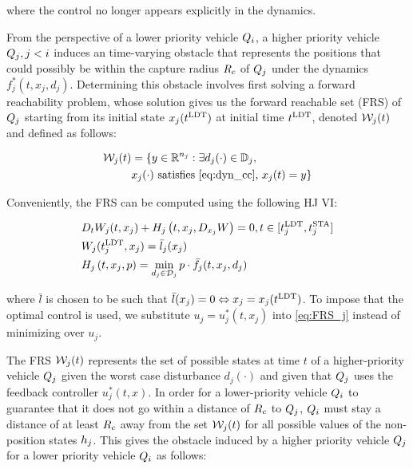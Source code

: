 \noindent where the control no longer appears explicitly in the dynamics.

From the perspective of a lower priority vehicle $Q_i$, a higher priority vehicle $Q_j, j < i$ induces an time-varying obstacle that represents the positions that could possibly be within the capture radius $R_c$ of $Q_j$ under the dynamics $f^*_j(t, x_j, d_j)$. Determining this obstacle involves first solving a forward reachability problem, whose solution gives us the forward reachable set (FRS) of $Q_j$ starting from its initial state $x_j(t^\text{LDT})$ at initial time $t^\text{LDT}$, denoted $\mathcal{W}_j(t)$ and defined as follows:

\begin{equation}
\label{eq:frs}
\begin{aligned}
\mathcal{W}_j(t) &= \{y \in \mathbb{R}^{n_j}: \exists d_j(\cdot) \in \mathbb{D}_j, \\
&x_j(\cdot) \text{ satisfies \eqref{eq:dyn_cc}, }x_j(t) = y\}
\end{aligned}
\end{equation}

Conveniently, the FRS can be computed using the following HJ VI:

\begin{equation}
\label{eq:FRS_j}
\begin{aligned}
&D_t W_j(t, x_j) + H_j\left(t, x_j, D_{x_j} W\right) = 0, t \in [t^\text{LDT}_j, t^\text{STA}_j]\\
&W_j(t^\text{LDT}_j, x_j) = \bar l_j(x_j) \\
&H_j\left(t, x_j, p\right) = \min_{d_j \in \mathcal{D}_j} p \cdot \bar f_j(t, x_j, d_j)
\end{aligned}
\end{equation}

\noindent where $\bar l$ is chosen to be such that $\bar l (x_j) = 0 \Leftrightarrow x_j = x_j(t^\text{LDT})$. To impose that the optimal control is used, we substitute $u_j = u_j^*(t, x_j)$ into \eqref{eq:FRS_j} instead of minimizing over $u_j$. 

The FRS $\mathcal{W}_j(t)$ represents the set of possible states at time $t$ of a higher-priority vehicle $Q_j$ given the worst case disturbance $d_j(\cdot)$ and given that $Q_j$ uses the feedback controller $u_j^*(t, x)$. In order for a lower-priority vehicle $Q_i$ to guarantee that it does not go within a distance of $R_c$ to $Q_j$, $Q_i$ must stay a distance of at least $R_c$ away from the set $\mathcal{W}_j(t)$ for all possible values of the non-position states $h_j$. This gives the obstacle induced by a higher priority vehicle $Q_j$ for a lower priority vehicle $Q_i$ as follows:

